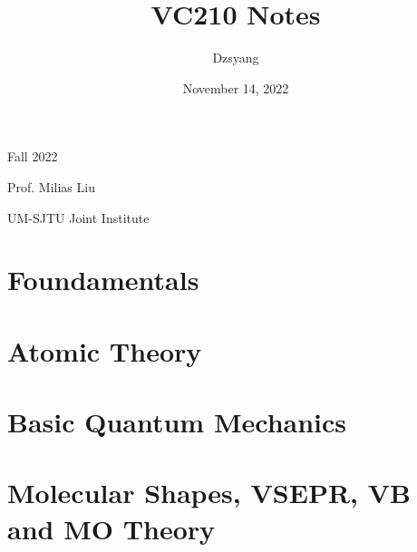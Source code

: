 \documentclass[a4paper,12pt]{article}
\begin{document}
\title{\huge VC210 Notes} 
\author{Dzsyang}
\date{November 14, 2022}

\maketitle %
\thispagestyle{fancy}

\begin{center}

\large Fall 2022\par
\large Prof. Milias Liu\par
\large UM-SJTU Joint Institute
\end{center}

\newpage

\tableofcontents

\newpage



\newpage
\section{Foundamentals}

\newpage
\section{Atomic Theory}

\newpage
\section{Basic Quantum Mechanics}

\newpage
\section{Molecular Shapes, VSEPR, VB and MO Theory}
\end{document}
